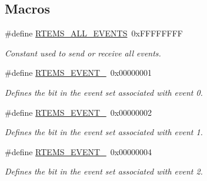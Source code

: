 \subsection*{Macros}
\begin{DoxyCompactItemize}
\item 
\mbox{\label{group__ClassicEventSet_gab923e5b97e0670c3678eacef83fb97fe}} 
\#define \mbox{\hyperlink{group__ClassicEventSet_gab923e5b97e0670c3678eacef83fb97fe}{R\+T\+E\+M\+S\+\_\+\+A\+L\+L\+\_\+\+E\+V\+E\+N\+TS}}~0x\+F\+F\+F\+F\+F\+F\+FF
\begin{DoxyCompactList}\small\item\em Constant used to send or receive all events. \end{DoxyCompactList}\item 
\mbox{\label{group__ClassicEventSet_ga40310258a3cbe2bef8420158c59f6acc}} 
\#define \mbox{\hyperlink{group__ClassicEventSet_ga40310258a3cbe2bef8420158c59f6acc}{R\+T\+E\+M\+S\+\_\+\+E\+V\+E\+N\+T\+\_}}~0x00000001
\begin{DoxyCompactList}\small\item\em Defines the bit in the event set associated with event 0. \end{DoxyCompactList}\item 
\mbox{\label{group__ClassicEventSet_ga9f027021d0070d4f9e35cccb41029e2d}} 
\#define \mbox{\hyperlink{group__ClassicEventSet_ga9f027021d0070d4f9e35cccb41029e2d}{R\+T\+E\+M\+S\+\_\+\+E\+V\+E\+N\+T\+\_}}~0x00000002
\begin{DoxyCompactList}\small\item\em Defines the bit in the event set associated with event 1. \end{DoxyCompactList}\item 
\mbox{\label{group__ClassicEventSet_gabe43c4a86241e31321b3cfe70045dca6}} 
\#define \mbox{\hyperlink{group__ClassicEventSet_gabe43c4a86241e31321b3cfe70045dca6}{R\+T\+E\+M\+S\+\_\+\+E\+V\+E\+N\+T\+\_}}~0x00000004
\begin{DoxyCompactList}\small\item\em Defines the bit in the event set associated with event 2. \end{DoxyCompactList}\item 
\mbox{\label{group__ClassicEventSet_ga59fb1c14abb8996e91c0cbf3276be503}} 

\end{DoxyCompactItemize}

